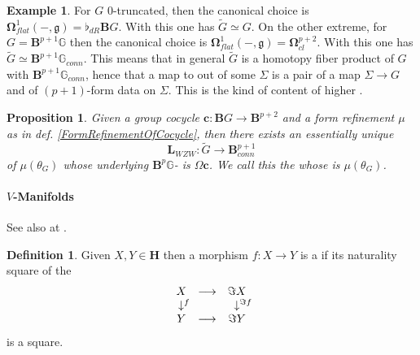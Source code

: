 \documentclass[12pt,titlepage]{article}
\def\mathrlap{\mathpalette\mathrlapinternal}
\def\mathrlapinternal#1#2{\rlap{$\mathsurround=0pt#1{#2}$}}
\newcommand{\itexarray}[1]{\begin{matrix}#1\end{matrix}}
\theoremstyle{plain}
\newtheorem{prop}{Proposition}
\theoremstyle{definition}
\newtheorem{defn}{Definition}
\newtheorem{example}{Example}
\theoremstyle{remark}
\begin{document}
\begin{example}
\label{}\hypertarget{}{}
For $G$ 0-truncated, then the canonical choice is $\mathbf{\Omega}^1_{flat}(-,\mathfrak{g}) = \flat_{dR}\mathbf{B}G$. With this one has $\tilde G \simeq G$.
On the other extreme, for $G = \mathbf{B}^{p+1}\mathbb{G}$ then the canonical choice is $\mathbf{\Omega}^1_{flat}(-,\mathfrak{g}) = \mathbf{\Omega}^{p+2}_{cl}$. With this one has $\tilde G \simeq \mathbf{B}^{p+1}\mathbb{G}_{conn}$.
This means that in general $\tilde G$ is a homotopy fiber product of $G$ with $\mathbf{B}^{p+1}\mathbb{G}_{conn}$, hence that a map to out of some $\Sigma$ is a pair of a map $\Sigma \to G$ and of $(p+1)$-form data on $\Sigma$. This is the kind of  content of higher .
\end{example}
\begin{prop}
\label{WZWTermFromCocycle}\hypertarget{WZWTermFromCocycle}{}
Given a group cocycle $\mathbf{c} \colon \mathbf{B}G \to \mathbf{B}^{p+2}$ and a form refinement $\mu$ as in def. \ref{FormRefinementOfCocycle}, then there exists an essentially unique 
\begin{displaymath}
\mathbf{L}_{WZW}
\colon
\tilde G \longrightarrow \mathbf{B}^{p+1}_{conn}
\end{displaymath}
of $\mu(\theta_G)$ whose underlying $\mathbf{B}^p\mathbb{G}$- is $\Omega \mathbf{c}$.
We call this the  whose  is $\mu(\theta_G)$.
\end{prop}
\hypertarget{Manifolds}{}\paragraph*{{$V$-Manifolds}}\label{Manifolds}
See also at .
\begin{defn}
\label{LocalDiffeomorphisms}\hypertarget{LocalDiffeomorphisms}{}
Given $X,Y\in \mathbf{H}$ then a morphism $f \colon X\longrightarrow Y$ is a  if its naturality square of the 
\begin{displaymath}
\itexarray{
X &\longrightarrow& \Im X
\\
\downarrow^{\mathrlap{f}} && \downarrow^{\mathrlap{\Im f}}
\\
Y &\longrightarrow& \Im Y
}
\end{displaymath}
is a  square.
\end{defn}
\end{document}

